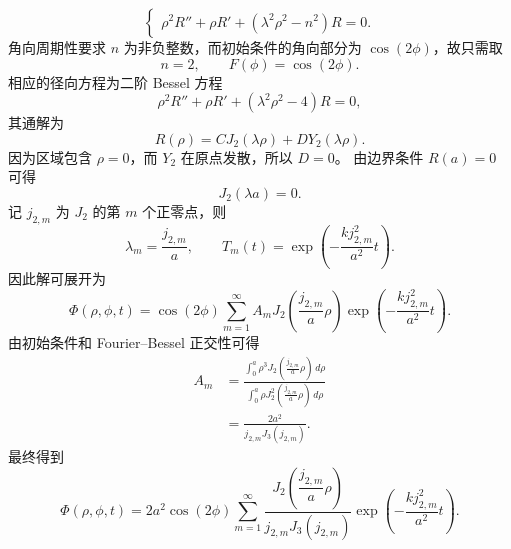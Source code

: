 \documentclass[a4paper]{article}
\begin{document}
\begin{enumerate}
\begin{equation*}
\begin{cases}
                \rho^2R''+\rho R'+(\lambda^2\rho^2-n^2)R=0.
            \end{cases}
        \end{equation*}
        角向周期性要求 $n$ 为非负整数，而初始条件的角向部分为
        $\cos(2\phi)$，故只需取
        \begin{equation*}
            n=2,\qquad F(\phi)=\cos(2\phi).
        \end{equation*}
        相应的径向方程为二阶 Bessel 方程
        \begin{equation*}
            \rho^2R''+\rho R'+(\lambda^2\rho^2-4)R=0,
        \end{equation*}
        其通解为
        \begin{equation*}
            R(\rho)=C J_2(\lambda\rho)+D Y_2(\lambda\rho).
        \end{equation*}
        因为区域包含 $\rho=0$，而 $Y_2$ 在原点发散，所以 $D=0$。
        由边界条件 $R(a)=0$ 可得
        \begin{equation*}
            J_2(\lambda a)=0.
        \end{equation*}
        记 $j_{2,m}$ 为 $J_2$ 的第 $m$ 个正零点，则
        \begin{equation*}
            \lambda_m=\frac{j_{2,m}}{a},\qquad
            T_m(t)=\exp\!\left(-\frac{k j_{2,m}^2}{a^2}t\right).
        \end{equation*}
        因此解可展开为
        \begin{equation*}
            \Phi(\rho,\phi,t)=\cos(2\phi)\sum_{m=1}^{\infty}A_m
            J_2\!\left(\frac{j_{2,m}}{a}\rho\right)
            \exp\!\left(-\frac{k j_{2,m}^2}{a^2}t\right).
        \end{equation*}
        由初始条件和 Fourier--Bessel 正交性可得
        \begin{align*}
            A_m
            &=\frac{\displaystyle\int_0^a \rho^3
            J_2\!\left(\frac{j_{2,m}}{a}\rho\right)\,d\rho}
            {\displaystyle\int_0^a \rho
            J_2^2\!\left(\frac{j_{2,m}}{a}\rho\right)\,d\rho}\\
            &=\frac{2a^2}{j_{2,m}J_3(j_{2,m})}.
        \end{align*}
        最终得到
        \begin{equation*}
            \Phi(\rho,\phi,t)=2a^2\cos(2\phi)
            \sum_{m=1}^{\infty}
            \frac{J_2\!\left(\dfrac{j_{2,m}}{a}\rho\right)}
            {j_{2,m}J_3(j_{2,m})}
            \exp\!\left(-\frac{k j_{2,m}^2}{a^2}t\right).
        \end{equation*}
\end{enumerate}

\end{document}
